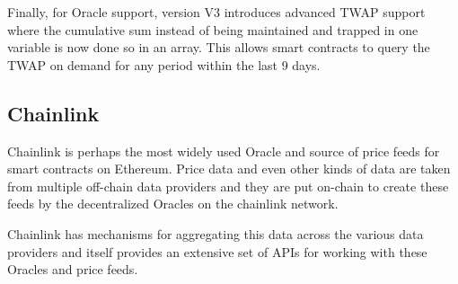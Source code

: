 Finally, for Oracle support, version V3 introduces advanced TWAP support
where the cumulative sum instead of being maintained and trapped in one
variable is now done so in an array. This allows smart contracts to
query the TWAP on demand for any period within the last 9 days.

\subsection{Chainlink}\label{chainlink}

Chainlink is perhaps the most widely used Oracle and source of price
feeds for smart contracts on Ethereum. Price data and even other kinds
of data are taken from multiple off-chain data providers and they are
put on-chain to create these feeds by the decentralized Oracles on the
chainlink network.

Chainlink has mechanisms for aggregating this data across the various
data providers and itself provides an extensive set of APIs for working
with these Oracles and price feeds.

